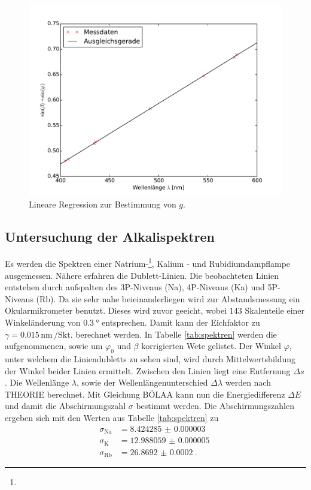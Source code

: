 \begin{figure}
	\centering
	\includegraphics[width=\textwidth]{Bilder/Gitterkonstante.pdf}
	\caption{Lineare Regression zur Bestimmung von $g$.}
	\label{fig:lin_reg}
\end{figure}


\subsection{Untersuchung der Alkalispektren}

Es werden die Spektren einer Natrium-\footnote{\Bat}, Kalium - und Rubidiumdampflampe ausgemessen. Nähere erfahren die Dublett-Linien. Die beobachteten Linien entstehen durch aufspalten des 3P-Niveaus (Na), 4P-Niveaus (Ka) und 5P-Niveaus (Rb).  Da sie sehr nahe beieinanderliegen wird zur Abstandsmessung ein Okularmikrometer benutzt. Dieses wird zuvor geeicht, wobei $143$ Skalenteile einer Winkeländerung von $\SI{0,3}{\degree}$ entsprechen. Damit kann der Eichfaktor zu $\gamma=0.015\,\si{\nano\meter}\,/\text{Skt.}$ berechnet werden. 
In Tabelle \ref{tab:spektren} werden die aufgenommenen, sowie um $\varphi_0$ und $\beta$ korrigierten Wete gelistet. Der Winkel $\varphi$, unter welchem die Liniendubletts zu sehen sind, wird durch Mittelwertsbildung der Winkel beider Linien ermittelt. Zwischen den Linien liegt eine Entfernung $\Delta{s}$ . Die Wellenlänge $\lambda$, sowie der Wellenlängenunterschied $\Delta{\lambda}$ werden nach THEORIE berechnet. Mit Gleichung BÖLAA kann nun die Energiedifferenz $\Delta{E}$ und damit die Abschirmungszahl $\sigma$ bestimmt werden.
Die Abschirmungszahlen ergeben sich mit den Werten aus Tabelle \ref{tab:spektren} zu 
\begin{align}
\sigma_\mathup{Na}&=\SI{8.424285(3)}{} \\
\sigma_\mathup{K\:}&=\SI{12.988059(5)}{}\\
\sigma_\mathup{Rb}&=\SI{26.8692(2)}{}.
\end{align}
